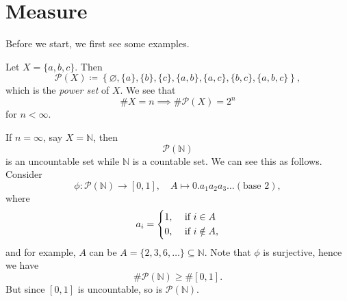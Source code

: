 \chapter{Measure}\label{ch:Measure}
Before we start, we first see some examples.
\begin{eg}
	Let \(X = \{a, b, c\}\). Then
	\[
		\mathcal{P}(X)\coloneqq \left\{\varnothing , \{a\}, \{b\}, \{c\}, \{a, b\}, \{a, c\}, \{b, c\}, \{a, b, c\}\right\},
	\]
	which is the \emph{power set} of \(X\). We see that
	\[
		\# X = n \implies \# \mathcal{P}(X) = 2^n
	\]
	for \(n< \infty\).
\end{eg}
\begin{eg}
	If \(n = \infty\), say \(X = \mathbb{N} \), then
	\[
		\mathcal{P} (\mathbb{N} )
	\]
	is an uncountable set while \(\mathbb{N}\) is a countable set. We can see this as follows. Consider
	\[
		\phi\colon \mathcal{P}(\mathbb{N}) \to \left[0, 1\right],\quad A\mapsto 0.a_1 a_2 a_3 \ldots (\text{base }2),
	\]
	where
	\[
		a_i = \begin{dcases}
			1, & \text{ if } i\in A     \\
			0, & \text{ if } i\notin A,
		\end{dcases}
	\]
	and for example, \(A\) can be
	\(A = \{2, 3, 6, \ldots  \}\subseteq \mathbb{N}\). Note that \(\phi\) is surjective, hence we have
	\[
		\# \mathcal{P}(\mathbb{N} ) \geq \#\left[0, 1\right].
	\]
	But since \(\left[0, 1\right]\) is uncountable, so is \(\mathcal{P} (\mathbb{N} )\).
\end{eg}

